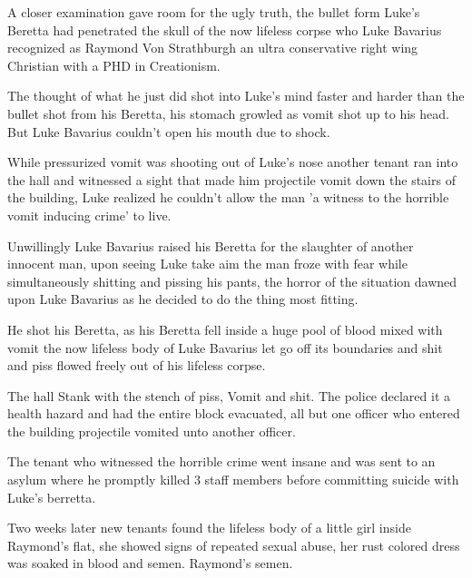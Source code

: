 A closer examination gave room for the ugly truth, the bullet form
Luke's Beretta had penetrated the skull of the now lifeless
corpse who Luke Bavarius recognized as Raymond Von Strathburgh an
ultra conservative right wing Christian with a PHD in
Creationism.



The thought of what he just did shot into Luke's mind faster
and harder than the bullet shot from his Beretta, his stomach
growled as vomit shot up to his head. But Luke Bavarius
couldn't open his mouth due to shock.



While pressurized vomit was shooting out of Luke's nose
another tenant ran into the hall and witnessed a sight that made
him projectile vomit down the stairs of the building, Luke realized
he couldn't allow the man 'a witness to the horrible vomit
inducing crime' to live.



Unwillingly Luke Bavarius raised his Beretta for the slaughter of
another innocent man, upon seeing Luke take aim the man froze with
fear while simultaneously shitting and pissing his pants, the
horror of the situation dawned upon Luke Bavarius as he decided to
do the thing most fitting.



He shot his Beretta, as his Beretta fell inside a huge pool of
blood mixed with vomit the now lifeless body of Luke Bavarius let
go off its boundaries and shit and piss flowed freely out of his
lifeless corpse.



The hall Stank with the stench of piss, Vomit and shit. The police
declared it a health hazard and had the entire block evacuated, all
but one officer who entered the building projectile vomited unto
another officer.



The tenant who witnessed the horrible crime went insane and was
sent to an asylum where he promptly killed 3 staff members before
committing suicide with Luke's berretta.



Two weeks later new tenants found the lifeless body of a little
girl inside Raymond's flat, she showed signs of repeated
sexual abuse, her rust colored dress was soaked in blood and semen.
Raymond's semen.


 





